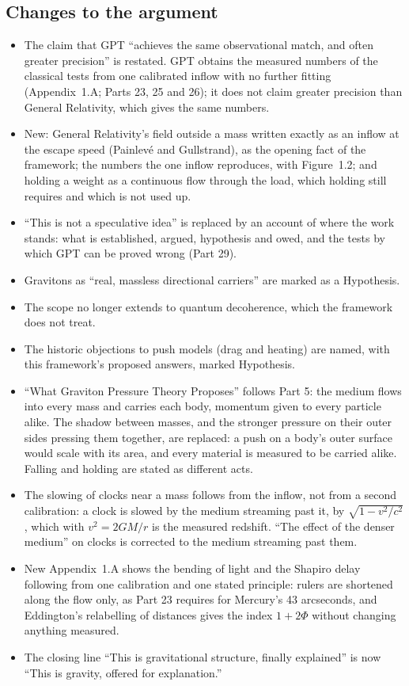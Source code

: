 \documentclass[11pt,a4paper]{article}
\begin{document}
\subsection*{Changes to the argument}
\begin{itemize}
  \item The claim that GPT ``achieves the same observational match, and often greater precision'' is restated. GPT obtains the measured numbers of the classical tests from one calibrated inflow with no further fitting (Appendix~1.A; Parts 23, 25 and 26); it does not claim greater precision than General Relativity, which gives the same numbers.
  \item New: General Relativity's field outside a mass written exactly as an inflow at the escape speed (Painlevé and Gullstrand), as the opening fact of the framework; the numbers the one inflow reproduces, with Figure~1.2; and holding a weight as a continuous flow through the load, which holding still requires and which is not used up.
  \item ``This is not a speculative idea'' is replaced by an account of where the work stands: what is established, argued, hypothesis and owed, and the tests by which GPT can be proved wrong (Part 29).
  \item Gravitons as ``real, massless directional carriers'' are marked as a Hypothesis.
  \item The scope no longer extends to quantum decoherence, which the framework does not treat.
  \item The historic objections to push models (drag and heating) are named, with this framework's proposed answers, marked Hypothesis.
  \item ``What Graviton Pressure Theory Proposes'' follows Part 5: the medium flows into every mass and carries each body, momentum given to every particle alike. The shadow between masses, and the stronger pressure on their outer sides pressing them together, are replaced: a push on a body's outer surface would scale with its area, and every material is measured to be carried alike. Falling and holding are stated as different acts.
  \item The slowing of clocks near a mass follows from the inflow, not from a second calibration: a clock is slowed by the medium streaming past it, by $\sqrt{1-v^2/c^2}$, which with $v^2=2GM/r$ is the measured redshift. ``The effect of the denser medium'' on clocks is corrected to the medium streaming past them.
  \item New Appendix~1.A shows the bending of light and the Shapiro delay following from one calibration and one stated principle: rulers are shortened along the flow only, as Part 23 requires for Mercury's 43 arcseconds, and Eddington's relabelling of distances gives the index $1+2\Phi$ without changing anything measured.
  \item The closing line ``This is gravitational structure, finally explained'' is now ``This is gravity, offered for explanation.''
\end{itemize}
\end{document}
